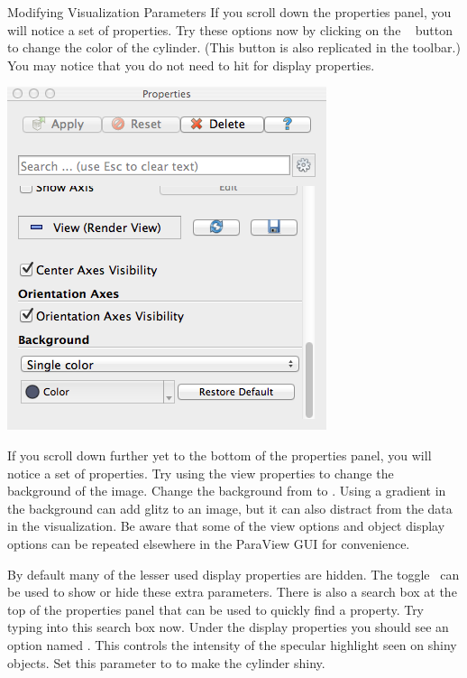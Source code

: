 \begin{exercise}{Modifying Visualization Parameters}
  If you scroll down the properties panel, you will notice
  a set of  properties.  Try these
  options now by clicking on the ~ button to
  change the color of the cylinder. (This button is also replicated in the
  toolbar.) You may notice that you do not need to hit  for
  display properties.

  \begin{inlinefig}
    \includegraphics[width=0.53\scw]{images/RenderViewOptions}
  \end{inlinefig}

  If you scroll down further yet to the bottom of the properties panel, you
  will notice a set of  properties. Try
  using the view properties to change the background
  of the image. Change the background from  to
  .  Using a
  gradient in the background can add glitz to an image, but it can also
  distract from the data in the visualization. Be aware that some of the
  view options and object display options can be repeated elsewhere in the
  ParaView GUI for convenience.

  By default many of the lesser used display properties are hidden.  The
   toggle~ can be used to
  show or hide these extra parameters. There is also a search box at the
  top of the properties panel that can be
  used to quickly find a property. Try typing  into this
  search box now. Under the display properties you should see an option
  named . This controls the intensity of the specular
  highlight seen on shiny objects.  
  Set this parameter to  to make the cylinder shiny.


\end{exercise}

